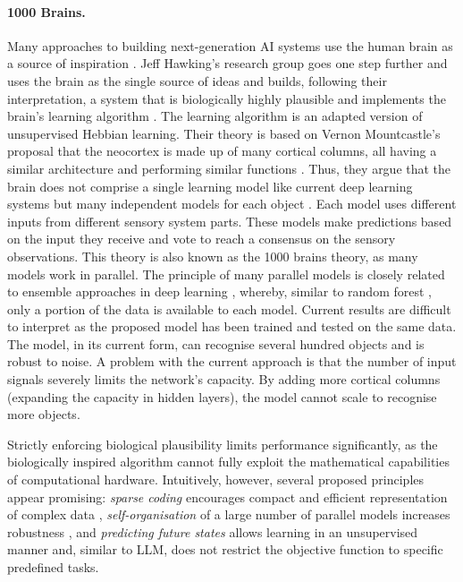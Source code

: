 \paragraph{1000 Brains.} Many approaches to building next-generation AI systems use the human brain as a source of inspiration \cite{Lades_Vorbruggen_Buhmann_Lange_vonderMalsburg_Wurtz_Konen_1993, Richards_Lillicrap_Beaudoin_Bengio_Bogacz_Christensen_Clopath_Costa_De}. Jeff Hawking's research group goes one step further and uses the brain as the single source of ideas and builds, following their interpretation, a system that is biologically highly plausible and implements the brain's learning algorithm . The learning algorithm is an adapted version of unsupervised Hebbian learning. Their theory is based on Vernon Mountcastle's proposal that the neocortex is made up of many cortical columns, all having a similar architecture and performing similar functions . Thus, they argue that the brain does not comprise a single learning model like current deep learning systems but many independent models for each object . Each model uses different inputs from different sensory system parts. These models make predictions based on the input they receive and vote to reach a consensus on the sensory observations.
This theory is also known as the 1000 brains theory, as many models work in parallel. The principle of many parallel models is closely related to ensemble approaches in deep learning , whereby, similar to random forest , only a portion of the data is available to each model. Current results are difficult to interpret as the proposed model has been trained and tested on the same data. The model, in its current form, can recognise several hundred objects and is robust to noise. A problem with the current approach is that the number of input signals severely limits the network's capacity. By adding more cortical columns (expanding the capacity in hidden layers), the model cannot scale to recognise more objects. 

Strictly enforcing biological plausibility limits performance significantly, as the biologically inspired algorithm cannot fully exploit the mathematical capabilities of computational hardware. Intuitively, however, several proposed principles appear promising: \emph{sparse coding} encourages compact and efficient representation of complex data , \emph{self-organisation} of a large number of parallel models increases robustness \cite{Yang_Lv_Chen_2023}, and \emph{predicting future states} allows learning in an unsupervised manner and, similar to LLM, does not restrict the objective function to specific predefined tasks.

